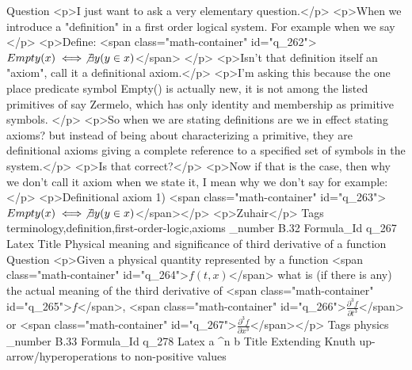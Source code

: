 Question <p>I just want to ask a very elementary question.</p>  <p>When we introduce a "definition" in a first order logical system. For example when we say </p>  <p>Define: <span class="math-container" id="q_262">$Empty(x) \iff \not \exists y (y \in x) $</span> </p>  <p>Isn't that definition itself an "axiom", call it a definitional axiom.</p>  <p>I'm asking this because the one place predicate symbol Empty() is actually new, it is not among the listed primitives of say Zermelo, which has only identity and membership as primitive symbols. </p>  <p>So when we are stating definitions are we in effect stating axioms? but instead of being about characterizing a primitive, they are definitional axioms giving a complete reference to a specified set of symbols in the system.</p>  <p>Is that correct?</p>  <p>Now if that is the case, then why we don't call it axiom when we state it, I mean why we don't say for example:</p>  <p>Definitional axiom 1) <span class="math-container" id="q_263">$Empty(x) \iff \not \exists y (y \in x)$</span></p>  <p>Zuhair</p>
Tags terminology,definition,first-order-logic,axioms
_number B.32
Formula_Id q_267
Latex 
Title Physical meaning and significance of third derivative of a function
Question <p>Given a physical quantity represented by a function <span class="math-container" id="q_264">$f(t,x)$</span> what is (if there is any) the actual meaning of the third derivative of <span class="math-container" id="q_265">$f$</span>, <span class="math-container" id="q_266">$\frac{\partial^3 f}{\partial t^3}$</span> or <span class="math-container" id="q_267">$\frac{\partial^3 f}{\partial x^3}$</span></p>
Tags physics
_number B.33
Formula_Id q_278
Latex a \uparrow^n b
Title Extending Knuth up-arrow/hyperoperations to non-positive values
